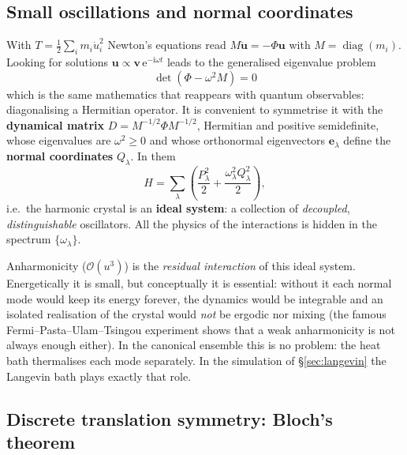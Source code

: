 \documentclass[11pt,a4paper]{article}
\newcommand{\ii}{\mathrm{i}}
\newcommand{\ee}{\mathrm{e}}
\begin{document}
\subsection{Small oscillations and normal coordinates}\label{sec:normales}

With $T=\tfrac12\sum_i m_i\dot u_i^2$ Newton's equations read
$M\ddot{\bm u}=-\Phi\bm u$ with $M=\operatorname{diag}(m_i)$. Looking for
solutions $\bm u\propto\bm v\,\ee^{-\ii\omega t}$ leads to the generalised
eigenvalue problem
\begin{equation}
\boxed{\det\!\left(\Phi-\omega^2 M\right)=0}
\label{eq:secular}
\end{equation}
which is the same mathematics that reappears with quantum observables:
diagonalising a Hermitian operator. It is convenient to symmetrise it with the
\textbf{dynamical matrix} $D=M^{-1/2}\Phi M^{-1/2}$, Hermitian and positive
semidefinite, whose eigenvalues are $\omega^2\geq0$ and whose orthonormal
eigenvectors $\bm e_\lambda$ define the \textbf{normal coordinates}
$Q_\lambda$. In them
\begin{equation}
H=\sum_\lambda\left(\frac{P_\lambda^2}{2}+\frac{\omega_\lambda^2Q_\lambda^2}{2}\right),
\end{equation}
i.e.\ the harmonic crystal is an \textbf{ideal system}: a collection of
\emph{decoupled}, \emph{distinguishable} oscillators. All the physics of the
interactions is hidden in the spectrum $\{\omega_\lambda\}$.

\begin{idea}
Anharmonicity ($\mathcal O(u^3)$) is the \emph{residual interaction} of this
ideal system. Energetically it is small, but conceptually it is essential:
without it each normal mode would keep its energy forever, the dynamics would be
integrable and an isolated realisation of the crystal would \emph{not} be
ergodic nor mixing (the famous Fermi–Pasta–Ulam–Tsingou experiment shows that a
weak anharmonicity is not always enough either). In the canonical ensemble this
is no problem: the heat bath thermalises each mode separately. In the simulation
of \S\ref{sec:langevin} the Langevin bath plays exactly that role.
\end{idea}

\subsection{Discrete translation symmetry: Bloch's theorem}
\end{document}
